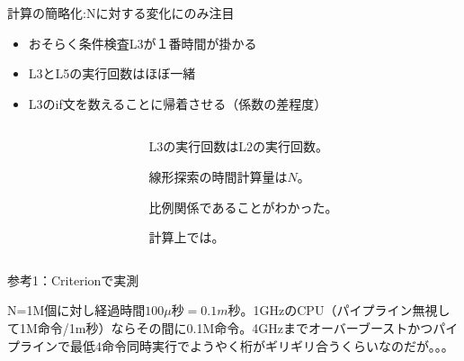 \documentclass{beamer}
\begin{document}
\begin{frame}[fragile]{計算の簡略化:Nに対する変化にのみ注目}{}
\begin{itemize}%
\item おそらく条件検査L3が１番時間が掛かる
\item L3とL5の実行回数はほぼ一緒
\item L3のif文を数えることに帰着させる（係数の差程度）
\end{itemize}

\vfill
\begin{columns}[T]
\begin{column}{0.6\textwidth}
\end{column}
\begin{column}{0.5\textwidth}
L3の実行回数はL2の実行回数。

\begin{block}{}
線形探索の時間計算量は$N$。
\end{block}

{\fontsize{8}{8}\selectfont 比例関係であることがわかった。}

\medskip
計算上では。
\end{column}
\end{columns}
\end{frame}

\begin{frame}[fragile]{参考1：Criterionで実測}{}
\begin{center}
\end{center}

\begin{spacing}{0.7}
\fontsize{7}{7}\selectfont
N=1M個に対し経過時間$100 \mu 秒 = 0.1 m秒$。1GHzのCPU（パイプライン無視して1M命令/1m秒）ならその間に0.1M命令。4GHzまでオーバーブーストかつパイプラインで最低4命令同時実行でようやく桁がギリギリ合うくらいなのだが。。。
\end{spacing}
\end{frame}
\end{document}
